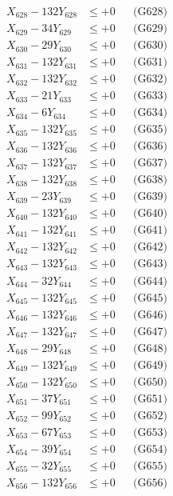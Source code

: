 \documentclass[a4paper,10pt]{article}
\begin{document}
{\begin{align}
X_{628} - 132Y_{628} &\leq +0 && \text{(G628)} \\
X_{629} - 34Y_{629} &\leq +0 && \text{(G629)} \\
X_{630} - 29Y_{630} &\leq +0 && \text{(G630)} \\
\allowbreak
X_{631} - 132Y_{631} &\leq +0 && \text{(G631)} \\
X_{632} - 132Y_{632} &\leq +0 && \text{(G632)} \\
X_{633} - 21Y_{633} &\leq +0 && \text{(G633)} \\
X_{634} - 6Y_{634} &\leq +0 && \text{(G634)} \\
X_{635} - 132Y_{635} &\leq +0 && \text{(G635)} \\
X_{636} - 132Y_{636} &\leq +0 && \text{(G636)} \\
X_{637} - 132Y_{637} &\leq +0 && \text{(G637)} \\
X_{638} - 132Y_{638} &\leq +0 && \text{(G638)} \\
X_{639} - 23Y_{639} &\leq +0 && \text{(G639)} \\
X_{640} - 132Y_{640} &\leq +0 && \text{(G640)} \\
\allowbreak
X_{641} - 132Y_{641} &\leq +0 && \text{(G641)} \\
X_{642} - 132Y_{642} &\leq +0 && \text{(G642)} \\
X_{643} - 132Y_{643} &\leq +0 && \text{(G643)} \\
X_{644} - 32Y_{644} &\leq +0 && \text{(G644)} \\
X_{645} - 132Y_{645} &\leq +0 && \text{(G645)} \\
X_{646} - 132Y_{646} &\leq +0 && \text{(G646)} \\
X_{647} - 132Y_{647} &\leq +0 && \text{(G647)} \\
X_{648} - 29Y_{648} &\leq +0 && \text{(G648)} \\
X_{649} - 132Y_{649} &\leq +0 && \text{(G649)} \\
X_{650} - 132Y_{650} &\leq +0 && \text{(G650)} \\
\allowbreak
X_{651} - 37Y_{651} &\leq +0 && \text{(G651)} \\
X_{652} - 99Y_{652} &\leq +0 && \text{(G652)} \\
X_{653} - 67Y_{653} &\leq +0 && \text{(G653)} \\
X_{654} - 39Y_{654} &\leq +0 && \text{(G654)} \\
X_{655} - 32Y_{655} &\leq +0 && \text{(G655)} \\
X_{656} - 132Y_{656} &\leq +0 && \text{(G656)} \\

\end{align}}
\end{document}
